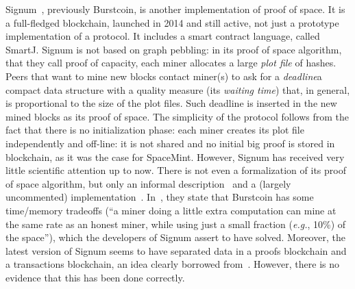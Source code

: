 Signum~\cite{Signum}, previously Burstcoin, is another implementation of proof of space.
It is a full-fledged blockchain, launched in 2014 and still active,
not just a prototype implementation of a protocol. It includes a smart contract language, called SmartJ.
Signum is not based on graph pebbling: in its proof of space algorithm, that they
call proof of capacity, each miner allocates a large \emph{plot file} of hashes.
Peers that want to mine new blocks contact miner(s) to ask for a
\emph{deadline}\ie a compact data structure with a quality measure (its \emph{waiting time}) that,
in general, is proportional to the size of the plot files. Such deadline is
inserted in the new mined blocks as its proof of space. The simplicity of the protocol
follows from the fact that there is no initialization phase: each miner creates its plot file
independently and off-line: it is not shared and no initial big proof is stored in
blockchain, as it was the case for SpaceMint.
However, Signum has received very little scientific
attention up to now. There is not even a formalization of its proof of space algorithm,
but only an informal description~\cite{SignumPlotting} and a (largely uncommented)
implementation~\cite{SignumSource}.
In~\cite{ParkKFGAP18}, they state that Burstcoin has some
time/memory tradeoffs (``a miner doing a little extra computation can mine at the same
rate as an honest miner, while using just a small fraction (\emph{e.g.}, 10\%) of the space''),
which the developers of Signum assert to have solved. Moreover, the latest version of Signum
seems to have separated data in a proofs blockchain and a transactions blockchain,
an idea clearly borrowed from~\cite{ParkKFGAP18}. However, there is no evidence that this has been done
correctly.
